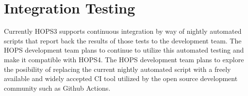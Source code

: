%
%
\section{Integration Testing}
\label{sec:integration}

Currently HOPS3 supports continuous integration by way of nightly automated scripts 
that report back the results of those tests to the development team.
The HOPS development team plans to continue to utilize this automated testing
and make it compatible with HOPS4. The HOPS development team plans to explore the posibility
of replacing the current nightly automated script with a freely available and widely
accepted CI tool utilized by the open source development community such as Github Actions. 


%
%

